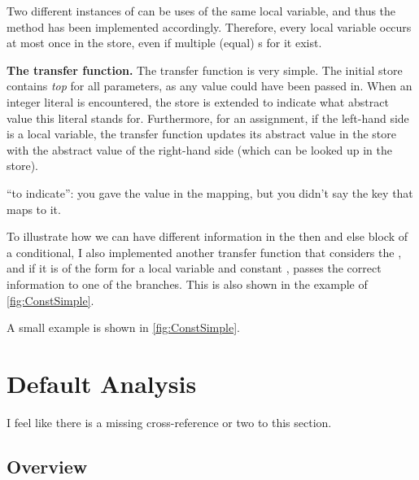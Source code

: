    Two different instances of  can be uses of the same local variable, and thus
    the  method has been implemented accordingly. Therefore, every local variable occurs
    at most once in the store, even if multiple (equal) s for it exist.
    
    \textbf{The transfer function.} The transfer function is very simple. The initial store contains
    \emph{top} for all parameters, as any value could have been passed in.  When 
    an integer literal is encountered, the store is extended to indicate what abstract value this literal
    stands for. Furthermore, for an assignment, if the left-hand side is
    a local variable, the transfer function updates its abstract value in the
    store with the abstract value of the right-hand side (which can be looked up in the store).
    
\begin{workinprogress}
``to indicate'':  you gave the value in the mapping, but you didn't say the
key that maps to it.
\end{workinprogress}

    To illustrate how we can have different information in the then and else block of a conditional,
    I also implemented another transfer function that considers the , and if
    it is of the form  for a local variable  and constant , passes
    the correct information to one of the branches. This is also shown in the example of \autoref{fig:ConstSimple}.
    
     A small example is shown in \autoref{fig:ConstSimple}.




\section{Default Analysis}

\begin{workinprogress}
I feel like there is a missing cross-reference or two to this section.
\end{workinprogress}

\subsection{Overview}

